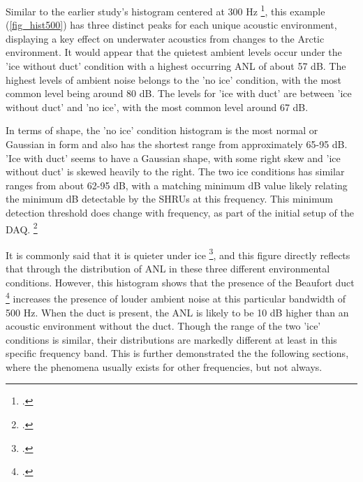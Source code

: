 Similar to the earlier study's histogram centered at 300 Hz \footcite[]{Bonnel2021}, this example (\autoref{fig_hist500}) has three distinct peaks for each unique acoustic environment, displaying a key effect on underwater acoustics from changes to the Arctic environment.  It would appear that the quietest ambient levels occur under the 'ice without duct' condition with a highest occurring ANL of about 57 dB. The highest levels of ambient noise belongs to  the 'no ice' condition, with the most common level being around 80 dB. The levels for 'ice with duct' are between 'ice without duct' and 'no ice', with the most common level around 67 dB. 

In terms of shape, the 'no ice' condition histogram is the most normal or Gaussian in form and also has the shortest range from approximately 65-95 dB. 'Ice with duct' seems to have a Gaussian shape, with some right skew and 'ice without duct' is skewed heavily to the right. The two ice conditions has similar ranges from about 62-95 dB, with a matching minimum dB value likely relating the minimum dB detectable by the SHRUs at this frequency. This minimum detection threshold does change with frequency, as part of the initial setup of the DAQ. \footcite{DAQprocess} %

It is commonly said that it is quieter under ice \footcite[]{ice_environ2}, and this figure directly reflects that through the distribution of ANL in these three different environmental conditions. However, this histogram shows that the presence of the Beaufort duct \footcite[]{beaufortduct} increases the presence of louder ambient noise at this particular bandwidth of 500 Hz. When the duct is present, the ANL is likely to be 10 dB higher than an acoustic environment without the duct. Though the range of the two 'ice' conditions is similar, their distributions are markedly different at least in this specific frequency band. This is further demonstrated the the following sections, where the phenomena usually exists for other frequencies, but not always. %


